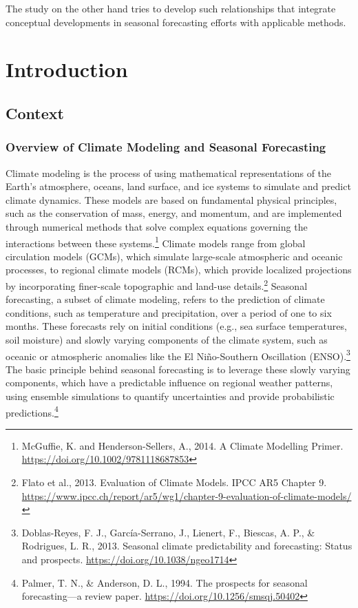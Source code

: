The study on the other hand tries to develop such relationships that integrate conceptual developments in seasonal forecasting efforts with applicable methods.
\newpage

\section{Introduction}
\subsection{Context}
\subsubsection{Overview of Climate Modeling and Seasonal Forecasting}
Climate modeling is the process of using mathematical representations of the Earth’s atmosphere, oceans, land surface, and ice systems to simulate and predict climate dynamics. These models are based on fundamental physical principles, such as the conservation of mass, energy, and momentum, and are implemented through numerical methods that solve complex equations governing the interactions between these systems.\footnote{McGuffie, K. and Henderson-Sellers, A., 2014. A Climate Modelling Primer. \url{https://doi.org/10.1002/9781118687853}} Climate models range from global circulation models (GCMs), which simulate large-scale atmospheric and oceanic processes, to regional climate models (RCMs), which provide localized projections by incorporating finer-scale topographic and land-use details.\footnote{Flato et al., 2013. Evaluation of Climate Models. IPCC AR5 Chapter 9. \url{https://www.ipcc.ch/report/ar5/wg1/chapter-9-evaluation-of-climate-models/}} Seasonal forecasting, a subset of climate modeling, refers to the prediction of climate conditions, such as temperature and precipitation, over a period of one to six months. These forecasts rely on initial conditions (e.g., sea surface temperatures, soil moisture) and slowly varying components of the climate system, such as oceanic or atmospheric anomalies like the El Niño-Southern Oscillation (ENSO).\footnote{Doblas-Reyes, F. J., García-Serrano, J., Lienert, F., Biescas, A. P., \& Rodrigues, L. R., 2013. Seasonal climate predictability and forecasting: Status and prospects. \url{https://doi.org/10.1038/ngeo1714}} The basic principle behind seasonal forecasting is to leverage these slowly varying components, which have a predictable influence on regional weather patterns, using ensemble simulations to quantify uncertainties and provide probabilistic predictions.\footnote{Palmer, T. N., \& Anderson, D. L., 1994. The prospects for seasonal forecasting—a review paper. \url{https://doi.org/10.1256/smsqj.50402}}  

